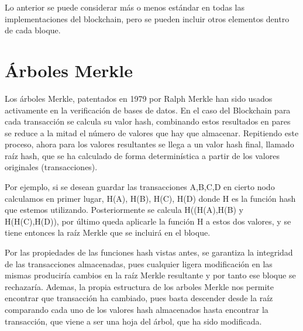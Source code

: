 Lo anterior se puede considerar más o menos estándar en todas las implementaciones del blockchain, pero se pueden incluir otros elementos dentro de cada bloque.
\begin{figure}[H]
  \qquad

	\label{fig:blockchain}%
\end{figure}

\section{Árboles Merkle}\label{merkle}
Los árboles Merkle, patentados en 1979 por Ralph Merkle\citep{merkle1987digital} han sido usados activamente en la verificación de bases de datos.
En el caso del Blockchain para cada transacción se calcula su valor hash, combinando estos resultados en pares se reduce a la mitad el número de valores que hay que almacenar. Repitiendo este proceso, ahora para los valores resultantes se llega a un valor hash final, llamado raíz hash, que se ha calculado de forma determinística a partir de los valores originales (transacciones).

Por ejemplo, si se desean guardar las transacciones A,B,C,D en cierto nodo calculamos en primer lugar, H(A), H(B), H(C), H(D) donde H es la función hash que estemos utilizando. Posteriormente se calcula H((H(A),H(B) y H(H(C),H(D)), por último queda aplicarle la función H a estos dos valores, y se tiene entonces la raíz Merkle que se incluirá en el bloque.

Por las propiedades de las funciones hash vistas antes, se garantiza la integridad de las transacciones almacenadas, pues cualquier ligera modificación en las mismas produciría cambios en la raíz Merkle resultante y por tanto ese bloque se rechazaría. Ademas, la propia estructura de los arboles Merkle nos permite encontrar que transacción ha cambiado, pues basta descender desde la raíz comparando cada uno de los valores hash almacenados hasta encontrar la transacción, que viene a ser una hoja del árbol, que ha sido modificada.

